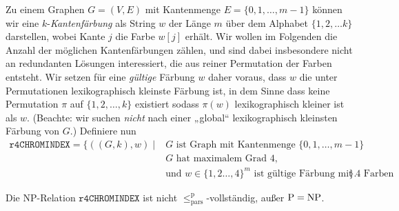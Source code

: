 %
%
Zu einem Graphen $G=(V,E)$ mit Kantenmenge $E=\{0,1,\dots, m-1\}$ können wir eine $k$-\emph{Kantenfärbung} als String $w$ der Länge $m$ über dem Alphabet $\{1,2,\dots k\}$ darstellen, wobei Kante $j$ die Farbe $w[j]$ erhält.
Wir wollen im Folgenden die Anzahl der möglichen Kantenfärbungen zählen, und sind dabei insbesondere nicht an redundanten Lösungen interessiert, die aus reiner Permutation der Farben entsteht. Wir setzen für eine \emph{gültige} Färbung $w$ daher voraus, dass $w$ die unter Permutationen lexikographisch kleinste Färbung ist, in dem Sinne dass keine Permutation $\pi$ auf $\{1,2,\dots,k\}$ existiert sodass $\pi(w)$ lexikographisch kleiner ist als $w$. (Beachte: wir suchen \emph{nicht} nach einer „global“ lexikographisch kleinsten Färbung von $G$.)
Definiere nun
\[ \begin{split} \mathtt{r4CHROMINDEX} = \{ ((G, k), w) \mid {}&\text{$G$ ist Graph mit Kantenmenge $\{0,1,\dots,m-1\}$} \\& \text{$G$ hat maximalem Grad 4,} \\ &\text{und $w\in\{1,2\dots,4\}^m$ ist gültige Färbung mit 4 Farben} \}.\end{split} \]
\begin{theorem}
    Die NP-Relation $\mathtt{r4CHROMINDEX}$ ist nicht $\leq_\mathrm{pars}^\mathrm p$-vollständig, außer $\mathrm{P}=\mathrm{NP}$.
\end{theorem}
